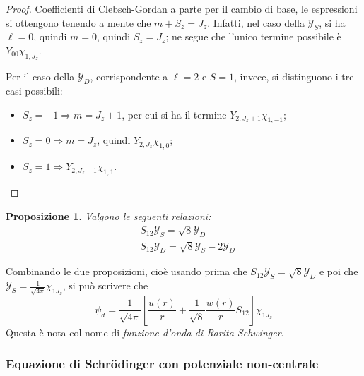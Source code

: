 \documentclass[11pt, a4paper]{scrartcl}
\theoremstyle{style}
\newtheorem{prop}{Proposizione}[section]
\numberwithin{equation}{subsection}
\begin{document}
\begin{proof}
Coefficienti di Clebsch-Gordan a parte per il cambio di base, le espressioni si ottengono tenendo a mente che $m+S_z = J_z$.
Infatti, nel caso della $\mathcal{Y} _S$, si ha $\ell =0$, quindi $m=0$, quindi $S_z = J_z$; ne segue che l'unico termine possibile \`e $Y_{00} \chi _{1,J_z}$.

Per il caso della $\mathcal{Y} _D$, corrispondente a $\ell =2$ e $S=1$, invece, si distinguono i tre casi possibili:
\begin{itemize}
	\item $S_z = -1\Rightarrow m = J_z + 1$, per cui si ha il termine $Y_{2,J_z + 1} \chi _{1,-1}$;
	\item $S_z = 0 \Rightarrow  m = J_z$, quindi $Y_{2,J_z}\chi _{1,0}$;
	\item $S_z = 1 \Rightarrow Y_{2,J_z - 1} \chi_{1,1}$.
\end{itemize}
\end{proof}
\begin{prop}
	Valgono le seguenti relazioni:
	\begin{align}
		&S_{12} \mathcal{Y} _S = \sqrt{8}  \mathcal{Y} _D\\
		& S_{12} \mathcal{Y} _D = \sqrt{8}  \mathcal{Y} _S - 2 \mathcal{Y} _D
	\end{align}
\end{prop}
\noindent Combinando le due proposizioni, cio\`e usando prima che $S_{12} \mathcal{Y} _S = \sqrt{8}  \mathcal{Y} _D$ e poi che $\mathcal{Y} _S = \frac{1}{\sqrt{4\pi} }\chi _{1J_z}$, si pu\`o scrivere che
\begin{equation}
	\psi _d = \frac{1}{\sqrt{4\pi} } \left[ \frac{u(r)}{r} + \frac{1}{\sqrt{8}}  \frac{w(r)}{r} S_{12}\right] \chi _{1J_z}
\end{equation}
Questa \`e nota col nome di \textit{funzione d'onda di Rarita-Schwinger}.
\subsubsection{Equazione di Schr\"odinger con potenziale non-centrale}
\end{document}
